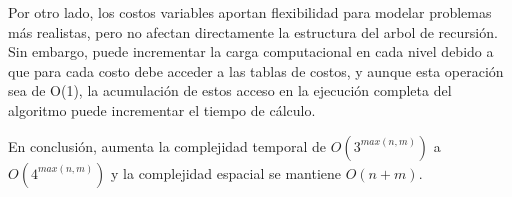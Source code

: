 Por otro lado, los costos variables aportan flexibilidad para modelar problemas más realistas, pero no afectan directamente la estructura del arbol de recursión. Sin embargo, puede incrementar la carga computacional en cada nivel debido a que para cada costo debe acceder a las tablas de costos, y aunque esta operación sea de O(1), la acumulación de estos acceso en la ejecución completa del algoritmo puede incrementar el tiempo de cálculo.

En conclusión, aumenta la complejidad temporal de \(O(3^{max(n,m)})\)  a \(O(4^{max(n,m)})\) y la complejidad espacial se mantiene \(O(n+m)\).